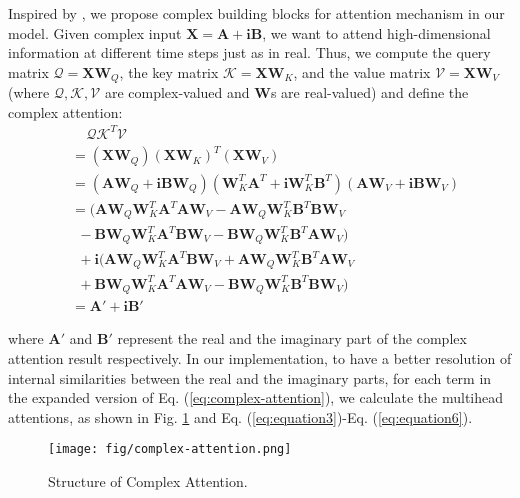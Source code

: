 \documentclass{article}
\def\vi{{\mathbf i}}
\def\mX{{\mathbf X}}
\def\mA{{\mathbf A}}
\def\mB{{\mathbf B}}
\def\mW{{\mathbf W}}
\begin{document}
Inspired by \cite{vaswani2017attention}, we propose complex building blocks for attention mechanism in our model. Given complex input $\mX = \mA + \vi \mB$, we want to attend high-dimensional information at different time steps just as in real. Thus, we compute the query matrix $\boldsymbol{\mathcal{Q}} = \mX\mW_Q$, the key matrix $\boldsymbol{\mathcal{K}} = \mX\mW_K$, and the value matrix $\boldsymbol{\mathcal{V}} = \mX\mW_V$ (where $\boldsymbol{\mathcal{Q}}, \boldsymbol{\mathcal{K}}, \boldsymbol{\mathcal{V}}$ are complex-valued and $\mW$s are real-valued) and define the complex attention: 
\begin{equation}
\label{eq:complex-attention}
\begin{split}
&\ \ \ \ \ \boldsymbol{\mathcal{Q}}\boldsymbol{\mathcal{K}}^T\boldsymbol{\mathcal{V}}  \\
& = (\mX\mW_Q)(\mX\mW_K)^T(\mX\mW_V) \\
& = (\mA\mW_Q + \vi\mB\mW_Q)(\mW_K^T\mA^T + \vi\mW_K^T\mB^T)(\mA\mW_V + \vi\mB\mW_V) \\
& = (\mA\mW_Q\mW_K^T\mA^T\mA\mW_V - \mA\mW_Q\mW_K^T\mB^T\mB\mW_V \\
&\ \ - \mB\mW_Q\mW_K^T\mA^T\mB\mW_V - \mB\mW_Q\mW_K^T\mB^T\mA\mW_V) \\ 
&\ \ + \vi(\mA\mW_Q\mW_K^T\mA^T\mB\mW_V + \mA\mW_Q\mW_K^T\mB^T\mA\mW_V \\
&\ \ + \mB\mW_Q\mW_K^T\mA^T\mA\mW_V - \mB\mW_Q\mW_K^T\mB^T\mB\mW_V) \\ 
& = \mA' + \vi \mB'
\end{split}
\end{equation}

where $\mA'$ and $\mB'$ represent the real and the imaginary part of the complex attention result respectively. In our implementation, to have a better resolution of internal similarities between the real and the imaginary parts, for each term in the expanded version of Eq. (\ref{eq:complex-attention}), we calculate the multihead attentions, as shown in Fig. \ref{fig:spec} and Eq. (\ref{eq:equation3})-Eq. (\ref{eq:equation6}).

\begin{figure}[H]
\texttt{[image: fig/complex-attention.png]}
\caption{Structure of Complex Attention.}
\label{fig:spec}
\end{figure}
\end{document}
